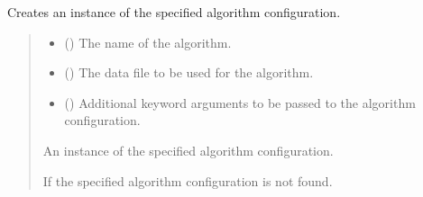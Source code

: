 \documentclass[letterpaper,10pt,english]{sphinxmanual}
\begin{document}
\begin{fulllineitems}
\begin{fulllineitems}
\label{\detokenize{application.factories:application.factories.AlgorithmFactory.AlgorithmFactory.create}}
\pysigstartsignatures
{}
\pysigstopsignatures
\sphinxAtStartPar
Creates an instance of the specified algorithm configuration.
\begin{quote}\begin{description}
\begin{itemize}
\item {} 
\sphinxAtStartPar
{} () \textendash{} The name of the algorithm.

\item {} 
\sphinxAtStartPar
{} () \textendash{} The data file to be used for the algorithm.

\item {} 
\sphinxAtStartPar
{} () \textendash{} Additional keyword arguments to be passed to the algorithm configuration.

\end{itemize}

\sphinxAtStartPar
An instance of the specified algorithm configuration.

\sphinxAtStartPar
{\hyperref[\detokenize{domain.interfaces:domain.interfaces.AlgorithmConfigurator.AlgorithmConfigurator}]{}}

\sphinxAtStartPar
{\hyperref[\detokenize{domain.exceptions:domain.exceptions.AlgorithmNotFound.AlgorithmDataNotFound}]{}} \textendash{} If the specified algorithm configuration is not found.

\end{description}\end{quote}

\end{fulllineitems}


\end{fulllineitems}
\end{document}
